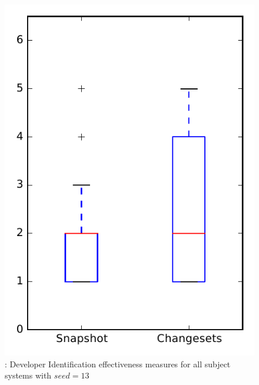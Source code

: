 
\begin{figure}
\centering
\includegraphics[height=0.4\textheight]{figures/dit_seed/rq1_overview_13}
\caption{\rtwo: Developer Identification effectiveness measures for all subject systems with $seed=13$}
\label{fig:dit_seed:rq1:overview}
\end{figure}
